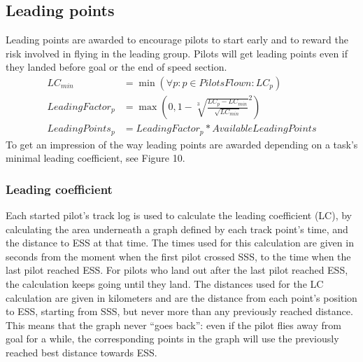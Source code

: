\documentclass{article}
\begin{document}
\subsection{Leading points}
Leading points are awarded to encourage pilots to start early and to reward the
risk involved in flying in the leading group. Pilots will get leading points
even if they landed before goal or the end of speed
section.
\begin{align*}
    LC_{min} &= \min(\forall p : p \in PilotsFlown : LC_p) \\
    LeadingFactor_p &= \max(0, 1 - \sqrt[3]{\frac{LC_p - LC_{min}}{\sqrt{LC_{min}}}}^2) \\
    LeadingPoints_p &= LeadingFactor_p * AvailableLeadingPoints
\end{align*}
To get an impression of the way leading points are awarded depending on a task’s minimal leading
coefficient, see Figure 10.

\subsubsection{Leading coefficient}
Each started pilot’s track log is used to calculate the leading coefficient
(LC), by calculating the area underneath a graph defined by each track point’s
time, and the distance to ESS at that time. The times used for this calculation
are given in seconds from the moment when the first pilot crossed SSS, to the
time when the last pilot reached ESS. For pilots who land out after the last
pilot reached ESS, the calculation keeps going until they land. The distances
used for the LC calculation are given in kilometers and are the distance from
each point’s position to ESS, starting from SSS, but never more than any
previously reached distance. This means that the graph never “goes back”: even
if the pilot flies away from goal for a while, the corresponding points in the
graph will use the previously reached best distance towards ESS.
\end{document}
